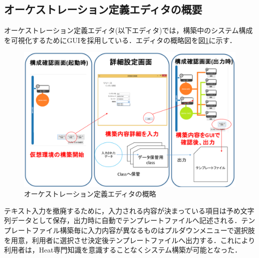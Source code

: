 \documentclass[a4j]{jarticle}
\begin{document}
\begin{Abstract}
 \subsection{オーケストレーション定義エディタの概要}
 オーケストレーション定義エディタ(以下エディタ)では，構築中のシステム構成を可視化するためにGUIを採用している．エディタの概略図を図\ref{graf:1}に示す．
 \begin{figure}[H]
 	\begin{center}
 		\vspace{-5mm}
 		\includegraphics[scale=0.27]{Document/GUIEditorOverview.eps}
 		\caption{オーケストレーション定義エディタの概略}
 		\label{graf:1}
 	\end{center}
 \end{figure}
 \vspace{-8mm}
 
 テキスト入力を撤廃するために，入力される内容が決まっている項目は予め文字列データとして保存，出力時に自動でテンプレートファイルへ記述される．テンプレートファイル構築毎に入力内容が異なるものはプルダウンメニューで選択肢を用意，利用者に選択させ決定後テンプレートファイルへ出力する．これにより利用者は，Heat専門知識を意識することなくシステム構築が可能となった．


\end{Abstract}
\end{document}
